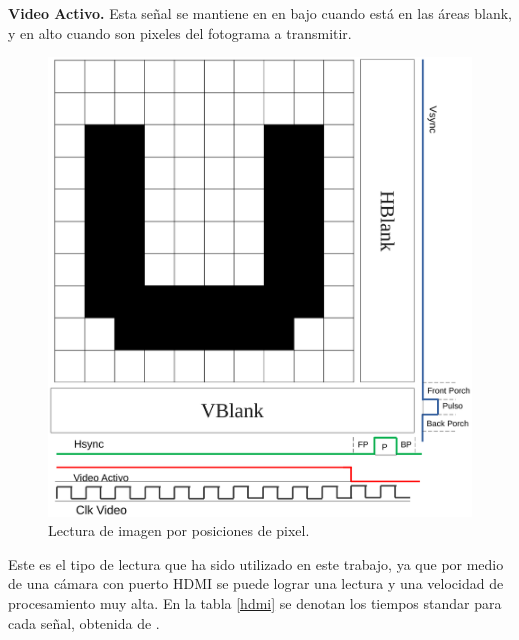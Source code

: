 \documentclass[twoside,spanish,ESP,MSc]{plantillaLabUPV}
\theoremstyle{definition}
\begin{document}
\begin{enumerate}
 \checkmark\textbf{Video Activo.} Esta señal se mantiene en en bajo cuando está en las áreas blank, y en alto cuando son pixeles del fotograma a transmitir.
 
 
 \begin{figure}[!tbh]
 	\centering
 	\includegraphics[scale=0.3]{edrawimas/scanU}
 	\caption{Lectura de imagen por posiciones de pixel. 
 		\label{scanU}}
 \end{figure}
 
\end{enumerate}

Este es el tipo de lectura que ha sido utilizado en este trabajo, ya que por medio de una cámara con puerto HDMI se puede lograr una lectura y una velocidad de procesamiento muy alta. En la tabla \ref{hdmi} se denotan los tiempos standar para cada señal, obtenida de \cite{demisti}.
\end{document}

